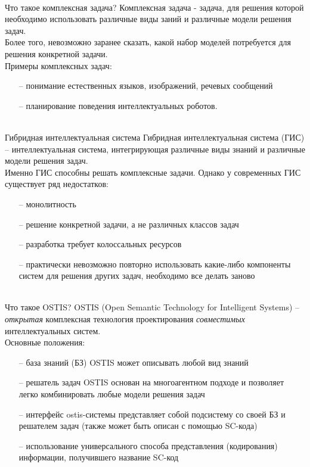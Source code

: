 \begin{frame}{\\Что такое комплексная задача?}
	Комплексная задача - задача, для решения которой необходимо использовать различные виды заний и различные модели решения задач. \\ \vspace{3mm}
	Более того, невозможно заранее сказать, какой набор моделей потребуется для решения конкретной задачи. \\
	\vspace{5mm}
	Примеры комплексных задач:
	\begin{itemize}
		\item[--] понимание естественных языков, изображений, речевых сообщений \\
		\item[--] планирование поведения интеллектуальных роботов.
	\end{itemize}
\end{frame}

\begin{frame}{\\Гибридная интеллектуальная система}
	Гибридная интеллектуальная система (ГИС) -- интеллектуальная система, интегрирующая различные виды знаний и различные модели решения задач.\\
	Именно ГИС способны решать комплексные задачи. Однако у современных ГИС существует ряд недостатков:
	\begin{itemize}
		\item[--] монолитность 
		\item[--] решение конкретной задачи, а не различных классов задач
		\item[--] разработка требует колоссальных ресурсов
		\item[--] практически невозможно повторно использовать какие-либо компоненты систем для решения других задач, необходимо все делать заново
	\end{itemize}
\end{frame}

\begin{frame}{\\Что такое OSTIS?}
	\vspace{5mm}
	OSTIS (Open Semantic Technology for Intelligent Systems) – \textit{открытая} комплексная технология проектирования \textit{совместимых} интеллектуальных систем.\\
	Основные положения:
		\begin{itemize}
		\item[--] база знаний (БЗ) OSTIS может описывать любой вид знаний
		\item[--] решатель задач OSTIS основан на многоагентном подходе и позволяет легко комбинировать любые модели решения задач
		\item[--] интерфейс ostis-системы представляет собой подсистему со своей БЗ и решателем задач (также может быть описан с помощью SC-кода)
		\item[--] использование универсального способа представления (кодирования) информации, получившего название SC-код 
	\end{itemize}
\end{frame}

